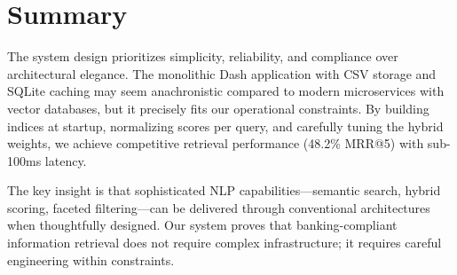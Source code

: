 \section{Summary}

The system design prioritizes simplicity, reliability, and compliance over architectural elegance. The monolithic Dash application with CSV storage and SQLite caching may seem anachronistic compared to modern microservices with vector databases, but it precisely fits our operational constraints. By building indices at startup, normalizing scores per query, and carefully tuning the hybrid weights, we achieve competitive retrieval performance (48.2\% MRR@5) with sub-100ms latency.

The key insight is that sophisticated NLP capabilities—semantic search, hybrid scoring, faceted filtering—can be delivered through conventional architectures when thoughtfully designed. Our system proves that banking-compliant information retrieval does not require complex infrastructure; it requires careful engineering within constraints.